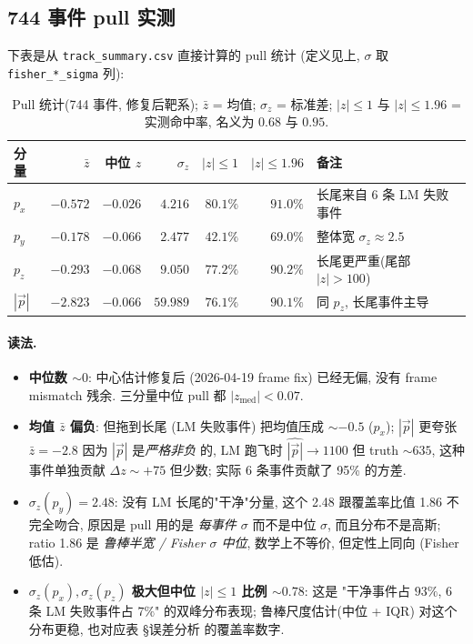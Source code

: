 \subsection{744 事件 pull 实测}
\label{sec:partIII:pulls:measured}

下表是从 \texttt{track\_summary.csv} 直接计算的 pull 统计 (定义见上, $\sigma$ 取 \texttt{fisher\_*\_sigma} 列):

\begin{table}[H]
\centering\small
\caption{Pull 统计(744 事件, 修复后靶系); $\bar z$ = 均值; $\sigma_z$ = 标准差; $|z|\le 1$ 与 $|z|\le 1.96$ = 实测命中率, 名义为 $0.68$ 与 $0.95$.}
\label{tab:partIII:pull_measured}
\begin{tabular}{lrrrrrl}
\toprule
分量 & $\bar z$ & 中位 $z$ & $\sigma_z$ & $|z|\le 1$ & $|z|\le 1.96$ & 备注 \\
\midrule
$p_x$ & $-0.572$ & $-0.026$ & $4.216$ & $80.1\%$ & $91.0\%$ & 长尾来自 6 条 LM 失败事件 \\
$p_y$ & $-0.178$ & $-0.066$ & $2.477$ & $42.1\%$ & $69.0\%$ & 整体宽 $\sigma_z \approx 2.5$ \\
$p_z$ & $-0.293$ & $-0.068$ & $9.050$ & $77.2\%$ & $90.2\%$ & 长尾更严重(尾部 $|z| > 100$) \\
$|\vec p|$ & $-2.823$ & $-0.066$ & $59.989$ & $76.1\%$ & $90.1\%$ & 同 $p_z$, 长尾事件主导 \\
\bottomrule
\end{tabular}
\end{table}

\paragraph{读法.}
\begin{itemize}[nosep]
  \item \textbf{中位数 $\sim 0$}: 中心估计修复后 (2026-04-19 frame fix) 已经无偏, 没有 frame mismatch 残余. 三分量中位 pull 都 $|z_{\mathrm{med}}| < 0.07$.
  \item \textbf{均值 $\bar z$ 偏负}: 但拖到长尾 (LM 失败事件) 把均值压成 $\sim -0.5$ ($p_x$); $|\vec p|$ 更夸张 $\bar z = -2.8$ 因为 $|\vec p|$ 是\emph{严格非负} 的, LM 跑飞时 $\hat{|\vec p|} \to 1100$ 但 truth $\sim 635$, 这种事件单独贡献 $\Delta z \sim +75$ 但少数; 实际 6 条事件贡献了 95\% 的方差.
  \item \textbf{$\sigma_z (p_y) = 2.48$}: 没有 LM 长尾的"干净"分量, 这个 2.48 跟覆盖率比值 1.86 不完全吻合, 原因是 pull 用的是 \emph{每事件 $\sigma$} 而不是中位 $\sigma$, 而且分布不是高斯; ratio 1.86 是 \emph{鲁棒半宽 / Fisher $\sigma$ 中位}, 数学上不等价, 但定性上同向 (Fisher 低估).
  \item \textbf{$\sigma_z (p_x), \sigma_z (p_z)$ 极大但中位 $|z|\le 1$ 比例 $\sim 0.78$}: 这是 "干净事件占 $93\%$, 6 条 LM 失败事件占 $7\%$" 的双峰分布表现; 鲁棒尺度估计(中位 + IQR) 对这个分布更稳, 也对应表 §误差分析 的覆盖率数字.
\end{itemize}

